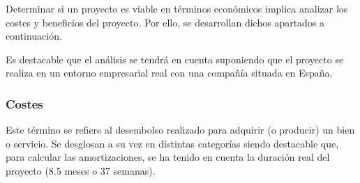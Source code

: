 Determinar si un proyecto es viable en términos económicos implica analizar los costes y beneficios del proyecto. Por ello, se desarrollan dichos apartados a continuación.

Es destacable que el análisis se tendrá en cuenta suponiendo que el proyecto se realiza en un entorno empresarial real con una compañía situada en España.

\subsubsection{Costes}

Este término se refiere al desembolso realizado para adquirir (o producir) un bien o servicio. Se desglosan a su vez en distintas categorías siendo destacable que, para calcular las amortizaciones, se ha tenido en cuenta la duración real del proyecto (8.5 meses o 37 semanas).

